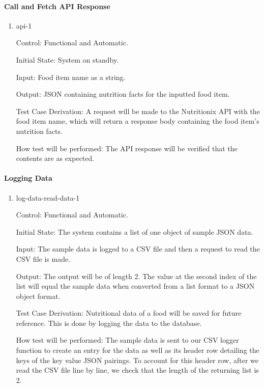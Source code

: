 \documentclass[12pt, titlepage]{article}
\begin{document}
	\paragraph{Call and Fetch API Response}
	
	\begin{enumerate}
		
		\item{api-1\\}
		
		Control: Functional and Automatic.
		
		Initial State: System on standby.
		
		Input: Food item name as a string.
		
		Output: JSON containing nutrition facts for the inputted food item.
		
		Test Case Derivation: A request will be made to the Nutritionix API 
		with the food item name, which will return a response body containing 
		the food item's nutrition facts.
		
		How test will be performed: The API response will be verified that the 
		contents are as expected.
		
	\end{enumerate}
	
	\paragraph{Logging Data}
	
	\begin{enumerate}
		
		\item{log-data-read-data-1\\}
		
		Control: Functional and Automatic.
		
		Initial State: The system contains a list of one object of sample JSON data.
		
		Input: The sample data is logged to a CSV file and then a request to read the CSV file is made.
		
		Output: The output will be of length 2. The value at the second index of the list will equal the sample data when converted from a list format to a JSON object format. 
		
		Test Case Derivation: Nutritional data of a food will be saved for 
		future reference. This is done by logging the data to the database.
		
		How test will be performed: The sample data is sent to our CSV logger function to create an entry for the data as well as its header row detailing the keys of the key value JSON pairings. To account for this header row, after we read the CSV file line by line, we check that the length of the returning list is 2.
		
	\end{enumerate}
	
\end{document}
